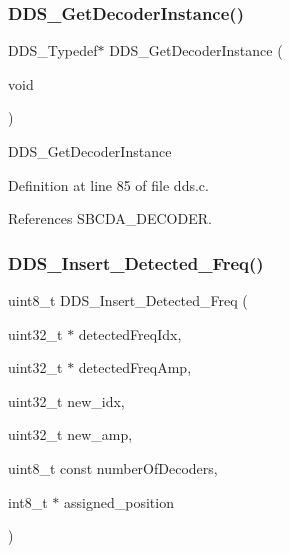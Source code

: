 \subsubsection{\texorpdfstring{D\+D\+S\+\_\+\+Get\+Decoder\+Instance()}{DDS\_GetDecoderInstance()}}
{\footnotesize\ttfamily D\+D\+S\+\_\+\+Typedef$\ast$ D\+D\+S\+\_\+\+Get\+Decoder\+Instance (\begin{DoxyParamCaption}\item[{void}]{ }\end{DoxyParamCaption})}

D\+D\+S\+\_\+\+Get\+Decoder\+Instance 

Definition at line 85 of file dds.\+c.



References S\+B\+C\+D\+A\+\_\+\+D\+E\+C\+O\+D\+ER.

\mbox{\label{group___d_d_s___a_p_i_ga50f75e7c6ac13f3ce0acd05055506455}} 
\subsubsection{\texorpdfstring{D\+D\+S\+\_\+\+Insert\+\_\+\+Detected\+\_\+\+Freq()}{DDS\_Insert\_Detected\_Freq()}}
{\footnotesize\ttfamily uint8\+\_\+t D\+D\+S\+\_\+\+Insert\+\_\+\+Detected\+\_\+\+Freq (\begin{DoxyParamCaption}\item[{uint32\+\_\+t $\ast$}]{detected\+Freq\+Idx,  }\item[{uint32\+\_\+t $\ast$}]{detected\+Freq\+Amp,  }\item[{uint32\+\_\+t}]{new\+\_\+idx,  }\item[{uint32\+\_\+t}]{new\+\_\+amp,  }\item[{uint8\+\_\+t const}]{number\+Of\+Decoders,  }\item[{int8\+\_\+t $\ast$}]{assigned\+\_\+position }\end{DoxyParamCaption})}

